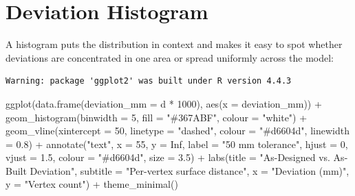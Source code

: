 \documentclass[
  11pt,
  letterpaper,
  DIV=11,
  numbers=noendperiod]{scrreprt}
\newenvironment{Shaded}{\begin{snugshade}}{\end{snugshade}}
\newcommand{\AttributeTok}[1]{\textcolor[rgb]{0.40,0.45,0.13}{#1}}
\newcommand{\ConstantTok}[1]{\textcolor[rgb]{0.56,0.35,0.01}{#1}}
\newcommand{\DecValTok}[1]{\textcolor[rgb]{0.68,0.00,0.00}{#1}}
\newcommand{\FloatTok}[1]{\textcolor[rgb]{0.68,0.00,0.00}{#1}}
\newcommand{\FunctionTok}[1]{\textcolor[rgb]{0.28,0.35,0.67}{#1}}
\newcommand{\NormalTok}[1]{\textcolor[rgb]{0.00,0.23,0.31}{#1}}
\newcommand{\SpecialCharTok}[1]{\textcolor[rgb]{0.37,0.37,0.37}{#1}}
\newcommand{\StringTok}[1]{\textcolor[rgb]{0.13,0.47,0.30}{#1}}
\begin{document}
\section{Deviation Histogram}\label{deviation-histogram}

A histogram puts the distribution in context and makes it easy to spot
whether deviations are concentrated in one area or spread uniformly
across the model:

\begin{verbatim}
Warning: package 'ggplot2' was built under R version 4.4.3
\end{verbatim}

\begin{Shaded}
\begin{Highlighting}[]
\FunctionTok{ggplot}\NormalTok{(}\FunctionTok{data.frame}\NormalTok{(}\AttributeTok{deviation\_mm =}\NormalTok{ d }\SpecialCharTok{*} \DecValTok{1000}\NormalTok{), }\FunctionTok{aes}\NormalTok{(}\AttributeTok{x =}\NormalTok{ deviation\_mm)) }\SpecialCharTok{+}
  \FunctionTok{geom\_histogram}\NormalTok{(}\AttributeTok{binwidth =} \DecValTok{5}\NormalTok{, }\AttributeTok{fill =} \StringTok{"\#367ABF"}\NormalTok{, }\AttributeTok{colour =} \StringTok{"white"}\NormalTok{) }\SpecialCharTok{+}
  \FunctionTok{geom\_vline}\NormalTok{(}\AttributeTok{xintercept =} \DecValTok{50}\NormalTok{, }\AttributeTok{linetype =} \StringTok{"dashed"}\NormalTok{, }\AttributeTok{colour =} \StringTok{"\#d6604d"}\NormalTok{, }\AttributeTok{linewidth =} \FloatTok{0.8}\NormalTok{) }\SpecialCharTok{+}
  \FunctionTok{annotate}\NormalTok{(}\StringTok{"text"}\NormalTok{, }\AttributeTok{x =} \DecValTok{55}\NormalTok{, }\AttributeTok{y =} \ConstantTok{Inf}\NormalTok{, }\AttributeTok{label =} \StringTok{"50 mm tolerance"}\NormalTok{,}
           \AttributeTok{hjust =} \DecValTok{0}\NormalTok{, }\AttributeTok{vjust =} \FloatTok{1.5}\NormalTok{, }\AttributeTok{colour =} \StringTok{"\#d6604d"}\NormalTok{, }\AttributeTok{size =} \FloatTok{3.5}\NormalTok{) }\SpecialCharTok{+}
  \FunctionTok{labs}\NormalTok{(}\AttributeTok{title =} \StringTok{"As{-}Designed vs. As{-}Built Deviation"}\NormalTok{,}
       \AttributeTok{subtitle =} \StringTok{"Per{-}vertex surface distance"}\NormalTok{,}
       \AttributeTok{x =} \StringTok{"Deviation (mm)"}\NormalTok{,}
       \AttributeTok{y =} \StringTok{"Vertex count"}\NormalTok{) }\SpecialCharTok{+}
  \FunctionTok{theme\_minimal}\NormalTok{()}
\end{Highlighting}
\end{Shaded}
\end{document}
